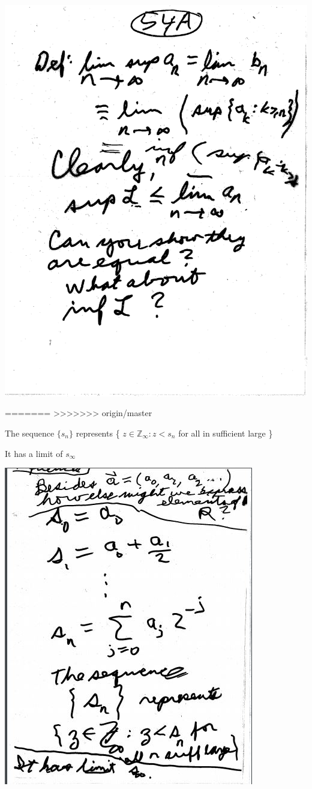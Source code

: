 \documentclass[10pt,a4paper]{article}
\begin{document}
{{\includegraphics[scale=.4]{Pages/LC_2}



=======
>>>>>>> origin/master

The sequence $\{s_{n}\}$ represents \{ ${z \in \mathbb{Z}_{\infty} : z < s_{n}} $ for all in sufficient large \}

It has a limit of $s_{\infty}$

\includegraphics[scale=.8]{Pages/S&L_page2}

}}
\end{document}

